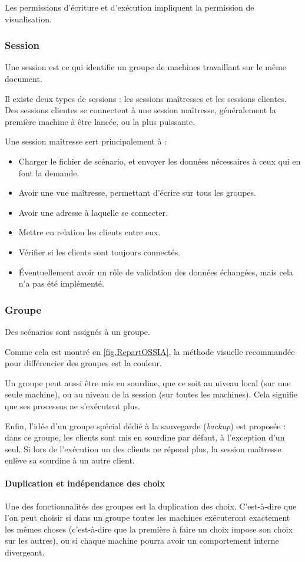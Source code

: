 Les permissions d'écriture et d'exécution impliquent la permission de visualisation.

\subsubsection{Session}
Une session est ce qui identifie un groupe de machines travaillant sur le même document.

Il existe deux types de sessions : les sessions maîtresses et les sessions clientes.
Des sessions clientes se connectent à une session maîtresse, généralement la première machine à être lancée, ou la plus puissante.

Une session maîtresse sert principalement à : 
\begin{itemize}
	\item Charger le fichier de scénario, et envoyer les données nécessaires à ceux qui en font la demande.
	\item Avoir une vue maîtresse, permettant d'écrire sur tous les groupes.
	\item Avoir une adresse à laquelle se connecter.
	\item Mettre en relation les clients entre eux.
	\item Vérifier si les clients sont toujours connectés.
	\item Éventuellement avoir un rôle de validation des données échangées, mais cela n'a pas été implémenté.
\end{itemize}

\subsubsection{Groupe}
Des scénarios sont assignés à un groupe.

Comme cela est montré en \cref{fig.RepartOSSIA}, la méthode visuelle recommandée pour différencier des groupes est la couleur.

Un groupe peut aussi être mis en sourdine, que ce soit au niveau local (sur une seule machine), ou au niveau de la session (sur toutes les machines). Cela signifie que ses processus ne s'exécutent plus. 

Enfin, l'idée d'un groupe spécial dédié à la sauvegarde (\textit{backup}) est proposée : dans ce groupe, les clients sont mis en sourdine par défaut, à l'exception d'un seul. Si lors de l'exécution un des clients ne répond plus, la session maîtresse enlève sa sourdine à un autre client.

\paragraph{Duplication et indépendance des choix}
Une des fonctionnalités des groupes est la duplication des choix. C'est-à-dire que l'on peut choisir si dans un groupe toutes les machines exécuteront exactement les mêmes choses (c'est-à-dire que la première à faire un choix impose son choix sur les autres), ou si chaque machine pourra avoir un comportement interne divergeant.

